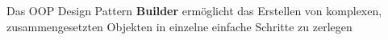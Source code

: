 Das OOP Design Pattern \textbf{Builder} ermöglicht das Erstellen von komplexen, zusammengesetzten Objekten in einzelne einfache Schritte zu zerlegen